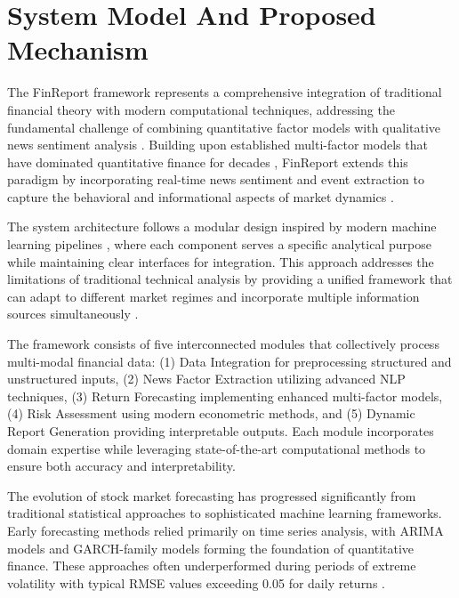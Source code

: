 \documentclass[3p,times,procedia]{elsarticle}
\begin{document}
\section{System Model And Proposed Mechanism}

The FinReport framework represents a comprehensive integration of traditional financial theory with modern computational techniques, addressing the fundamental challenge of combining quantitative factor models \cite{FAMA1993,Carhart1997} with qualitative news sentiment analysis \cite{TETLOCK2007,Xing2018}. Building upon established multi-factor models that have dominated quantitative finance for decades \cite{Banz1981,Rosenberg1985}, FinReport extends this paradigm by incorporating real-time news sentiment and event extraction to capture the behavioral and informational aspects of market dynamics \cite{Daniel1998,Campbell2001}.

The system architecture follows a modular design inspired by modern machine learning pipelines \cite{Fischer2018}, where each component serves a specific analytical purpose while maintaining clear interfaces for integration. This approach addresses the limitations of traditional technical analysis \cite{Murphy1999,Wilder1978} by providing a unified framework that can adapt to different market regimes and incorporate multiple information sources simultaneously \cite{Lo2004}.

The framework consists of five interconnected modules that collectively process multi-modal financial data: (1) Data Integration for preprocessing structured and unstructured inputs, (2) News Factor Extraction utilizing advanced NLP techniques, (3) Return Forecasting implementing enhanced multi-factor models, (4) Risk Assessment using modern econometric methods, and (5) Dynamic Report Generation providing interpretable outputs. Each module incorporates domain expertise while leveraging state-of-the-art computational methods to ensure both accuracy and interpretability.

The evolution of stock market forecasting has progressed significantly from traditional statistical approaches to sophisticated machine learning frameworks. Early forecasting methods relied primarily on time series analysis, with ARIMA models \cite{Box1970} and GARCH-family models \cite{Engle1982,Bollerslev1986} forming the foundation of quantitative finance. These approaches often underperformed during periods of extreme volatility with typical RMSE values exceeding 0.05 for daily returns \cite{Poon2003}.
\end{document}
